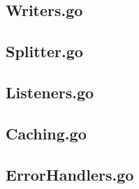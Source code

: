 \begin{appendices}
\subsection{Writers.go}
\label{sec:writer.go}


\newpage
\subsection{Splitter.go}
\label{sec:Splitter.go}


\subsection{Listeners.go}
\label{sec:Listeners.go}


\subsection{Caching.go}
\label{sec:Caching.go}


\subsection{ErrorHandlers.go}
\label{sec:ErrorHandlers.go}


\end{appendices}



